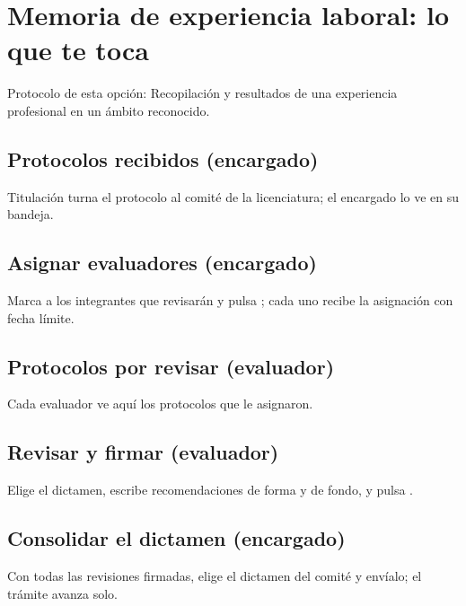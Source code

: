 \section{Memoria de experiencia laboral: lo que te toca}
Protocolo de esta opción: Recopilación y resultados de una experiencia profesional en un ámbito reconocido.
\subsection{Protocolos recibidos (encargado)}
Titulación turna el protocolo al comité de la licenciatura; el encargado lo ve en su bandeja.
\subsection{Asignar evaluadores (encargado)}
Marca a los integrantes que revisarán y pulsa ; cada uno recibe la asignación con fecha límite.
\subsection{Protocolos por revisar (evaluador)}
Cada evaluador ve aquí los protocolos que le asignaron.
\subsection{Revisar y firmar (evaluador)}
Elige el dictamen, escribe recomendaciones de forma y de fondo, y pulsa .
\subsection{Consolidar el dictamen (encargado)}
Con todas las revisiones firmadas, elige el dictamen del comité y envíalo; el trámite avanza solo.
